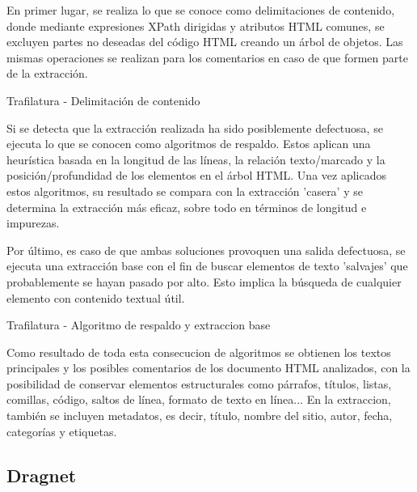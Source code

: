 En primer lugar, se realiza lo que se conoce como delimitaciones de contenido, donde mediante expresiones
XPath dirigidas y atributos HTML comunes, se excluyen partes no deseadas del código HTML creando un árbol
de objetos. Las mismas operaciones se realizan para los comentarios en caso de que formen parte de la
extracción.

\begin{codefloat}
  
  \caption{Trafilatura - Delimitación de contenido}
  \label{cod:trafilatura - delimitacion de contenido}
\end{codefloat}

Si se detecta que la extracción realizada ha sido posiblemente defectuosa, se ejecuta lo que se conocen 
como algoritmos de respaldo. Estos aplican una heurística basada en la longitud de las líneas, la relación 
texto/marcado y la posición/profundidad de los elementos en el árbol HTML. Una vez aplicados estos 
algoritmos, su resultado se compara con la extracción 'casera' y se determina la extracción más eficaz, 
sobre todo en términos de longitud e impurezas.

Por último, es caso de que ambas soluciones provoquen una salida defectuosa, se ejecuta una extracción base
con el fin de buscar elementos de texto 'salvajes' que probablemente se hayan pasado por alto. Esto implica
la búsqueda de cualquier elemento con contenido textual útil.

\begin{codefloat}
  
  \caption{Trafilatura - Algoritmo de respaldo y extraccion base}
  \label{cod:trafilatura - algoritmo de respaldo}
\end{codefloat}

Como resultado de toda esta consecucion de algoritmos se obtienen los textos principales y los posibles 
comentarios de los documento HTML analizados, con la posibilidad de conservar elementos estructurales como
párrafos, títulos, listas, comillas, código, saltos de línea, formato de texto en línea... En la extraccion, 
también se incluyen metadatos, es decir, título, nombre del sitio, autor, fecha, categorías y etiquetas.

\subsection{Dragnet}
\label{subsec:dragnet}

